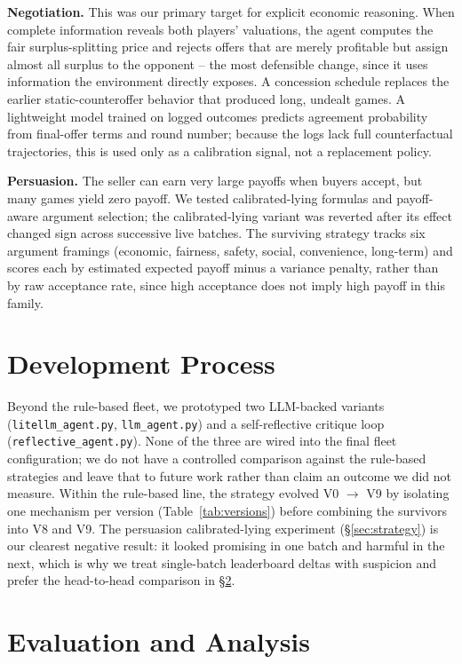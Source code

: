 \documentclass{article}
\begin{document}
\textbf{Negotiation.} This was our primary target for explicit economic reasoning. When complete information reveals both players' valuations, the agent computes the fair surplus-splitting price and rejects offers that are merely profitable but assign almost all surplus to the opponent -- the most defensible change, since it uses information the environment directly exposes. A concession schedule replaces the earlier static-counteroffer behavior that produced long, undealt games. A lightweight model trained on logged outcomes predicts agreement probability from final-offer terms and round number; because the logs lack full counterfactual trajectories, this is used only as a calibration signal, not a replacement policy.

\textbf{Persuasion.} The seller can earn very large payoffs when buyers accept, but many games yield zero payoff. We tested calibrated-lying formulas and payoff-aware argument selection; the calibrated-lying variant was reverted after its effect changed sign across successive live batches. The surviving strategy tracks six argument framings (economic, fairness, safety, social, convenience, long-term) and scores each by estimated expected payoff minus a variance penalty, rather than by raw acceptance rate, since high acceptance does not imply high payoff in this family.

\section{Development Process}
\label{sec:development}

Beyond the rule-based fleet, we prototyped two LLM-backed variants (\texttt{litellm\_agent.py}, \texttt{llm\_agent.py}) and a self-reflective critique loop (\texttt{reflective\_agent.py}). None of the three are wired into the final fleet configuration; we do not have a controlled comparison against the rule-based strategies and leave that to future work rather than claim an outcome we did not measure. Within the rule-based line, the strategy evolved V0 $\to$ V9 by isolating one mechanism per version (Table~\ref{tab:versions}) before combining the survivors into V8 and V9. The persuasion calibrated-lying experiment (\S\ref{sec:strategy}) is our clearest negative result: it looked promising in one batch and harmful in the next, which is why we treat single-batch leaderboard deltas with suspicion and prefer the head-to-head comparison in \S\ref{sec:evaluation}.

\section{Evaluation and Analysis}
\label{sec:evaluation}
\end{document}
